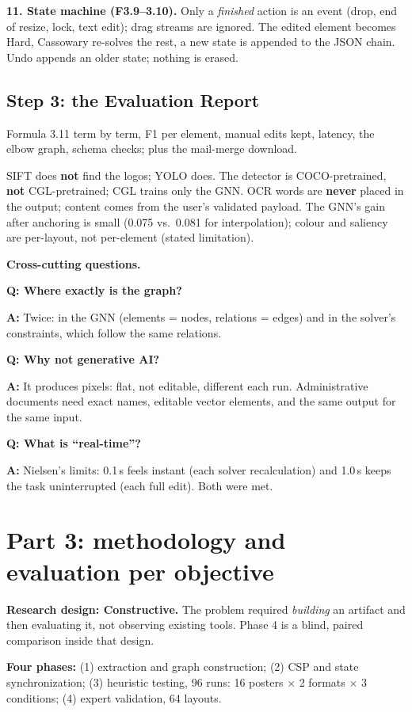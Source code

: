 \documentclass[10pt,a4paper]{article}
\newcommand{\Q}[1]{\par\smallskip\textbf{\color{navy}Q: #1}\par}
\newcommand{\A}{\textbf{A:} }
\begin{document}
\textbf{11. State machine (F3.9--3.10).} Only a \emph{finished} action is an event (drop, end of resize, lock, text edit); drag streams are ignored. The edited element becomes Hard, Cassowary re-solves the rest, a new state is appended to the JSON chain. Undo appends an older state; nothing is erased.

\subsection*{Step 3: the Evaluation Report}
Formula 3.11 term by term, F1 per element, manual edits kept, latency, the elbow graph, schema checks; plus the mail-merge download.

\begin{trap}
SIFT does \textbf{not} find the logos; YOLO does. The detector is COCO-pretrained, \textbf{not} CGL-pretrained; CGL trains only the GNN. OCR words are \textbf{never} placed in the output; content comes from the user's validated payload. The GNN's gain after anchoring is small (0.075 vs.\ 0.081 for interpolation); colour and saliency are per-layout, not per-element (stated limitation).
\end{trap}

\textbf{Cross-cutting questions.}
\Q{Where exactly is the graph?}
\A Twice: in the GNN (elements = nodes, relations = edges) and in the solver's constraints, which follow the same relations.
\Q{Why not generative AI?}
\A It produces pixels: flat, not editable, different each run. Administrative documents need exact names, editable vector elements, and the same output for the same input.
\Q{What is ``real-time''?}
\A Nielsen's limits: 0.1\,s feels instant (each solver recalculation) and 1.0\,s keeps the task uninterrupted (each full edit). Both were met.

\section{Part 3: methodology and evaluation per objective}

\textbf{Research design: Constructive.} The problem required \emph{building} an artifact and then evaluating it, not observing existing tools. Phase 4 is a blind, paired comparison inside that design.

\textbf{Four phases:} (1) extraction and graph construction; (2) CSP and state synchronization; (3) heuristic testing, 96 runs: 16 posters $\times$ 2 formats $\times$ 3 conditions; (4) expert validation, 64 layouts.
\end{document}
